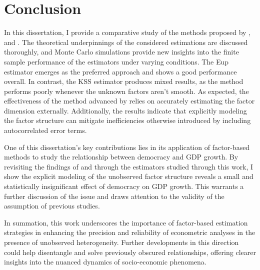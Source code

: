\section{Conclusion}

In this dissertation, I provide a comparative study of the methods proposed by \citet{bai2009panel}, \citet{kneip2012new} and \citet{bada2012phtt}. The theoretical underpinnings of the considered estimations are discussed thoroughly, and Monte Carlo simulations provide new insights into the finite sample performance of the estimators under varying conditions. The \ac{Eup} estimator emerges as the preferred approach and shows a good performance overall. In contrast, the \ac{KSS} estimator produces mixed results, as the method performs poorly whenever the unknown factors aren't smooth. As expected, the effectiveness of the method advanced by \citet{bai2009panel} relies on accurately estimating the factor dimension externally. Additionally, the results indicate that explicitly modeling the factor structure can mitigate inefficiencies otherwise introduced by including autocorrelated error terms. 

One of this dissertation's key contributions lies in its application of factor-based methods to study the relationship between democracy and \ac{GDP} growth. By revisiting the findings of \citet{acemoglu2019democracy} and \citet{chen2019mastering} through the estimators studied through this work,  I show the explicit modeling of the unobserved factor structure reveals a small and statistically insignificant effect of democracy on \ac{GDP} growth. This warrants a further discussion of the issue and draws attention to the validity of the assumption of previous studies. 

In summation, this work underscores the importance of factor-based estimation strategies in enhancing the precision and reliability of econometric analyses in the presence of unobserved heterogeneity. Further developments in this direction could help disentangle and solve previously obscured relationships, offering clearer insights into the nuanced dynamics of socio-economic phenomena.



\clearpage


\thispagestyle{plainfancy}



